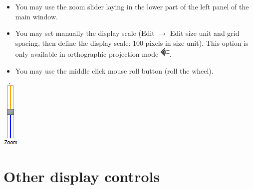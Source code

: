 \begin{minipage}{0.7\textwidth}
\begin{itemize}
\item You may use the zoom slider laying in the lower part of the left panel of the main window.
\item	You may set manually the display scale (Edit $\rightarrow$  Edit size unit and grid spacing, then define the display scale: 100 pixels in size unit). This option is only available in orthographic projection mode \includegraphics[scale=0.7]{images/06/camera/camera_ortho.png}.
\item	You may use the middle click mouse roll button (roll the wheel).
\end{itemize}
\end{minipage}    
\begin{minipage}{0.25\textwidth}\centering
  \includegraphics[scale=0.7]{images/06/camera/zoom_slider.png}


 \end{minipage}    




\section{Other display controls}


